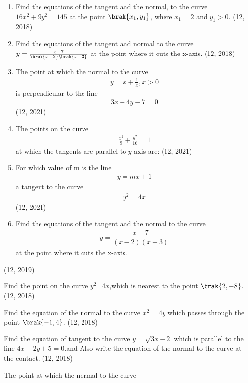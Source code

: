 \begin{enumerate}[label=\thesubsection.\arabic*,ref=\thesubsection.\theenumi]
\item Find the equations of the tangent and the normal, to the curve $16x^{2}+9y^{2}=145$ at the point $\brak{x_1,y_1}$, where $x_1=2$ and $y_1>0$. \hfill (12, 2018)
\item Find the equations of the tangent and normal to the curve $y = \frac{x - 7}{\brak{x - 2}\brak{x - 3}}$ at the point where it cuts the x-axis.
\hfill (12, 2018)
\item The point at which the normal to the curve 
\begin{align}
    y = x+\frac{1}{x}, x>0 
\end{align}
 is perpendicular to the line
 \begin{align}
     3x-4y-7 = 0 
 \end{align}
\hfill (12, 2021)
         \item The points on the curve
         \begin{align}
             \frac{x^2}{9} +\frac{y^2}{16} = 1
         \end{align}
         at which the tangents are parallel to $y$-axis are:
\hfill (12, 2021)
         \item For which value of m is the line
         \begin{align}
            y = mx + 1 
         \end{align}a tangent to the curve 
        \begin{align}
            y^2 = 4x 
        \end{align}
\hfill (12, 2021)
\item Find the equations of the tangent and the normal to the curve 
\begin{align*}
y=\dfrac{x-7}{(x-2)(x-3)}    
\end{align*}
at the point where it cuts the x-axis.
\end{enumerate} 
\hfill (12, 2019)
\item Find the point on the curve $y^2$=$4x$,which is nearest to the point $\brak{2,-8}$.  
\hfill (12, 2018)
\item Find the equation of the normal to the curve ${x}^2 = 4y$ which passes through the point $\brak{-1, 4}$.
\hfill (12, 2018)
\item Find the equation of tangent to the curve $y=\sqrt{3x-2}$ which is parallel to the line $4x-2y+5=0$.and Also write the equation of the normal to the curve at the contact.
\hfill (12, 2018)
\item The point at which the normal to the curve 
